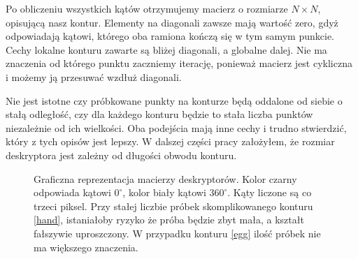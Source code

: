Po obliczeniu wszystkich kątów otrzymujemy macierz o rozmiarze $N \times N$,
opisującą nasz kontur. Elementy na diagonali zawsze mają wartość zero, gdyż
odpowiadają kątowi, którego oba ramiona kończą się w tym samym punkcie. Cechy
lokalne konturu zawarte są bliżej diagonali, a globalne dalej. Nie ma znaczenia
od którego punktu zaczniemy iterację, ponieważ macierz jest cykliczna i możemy
ją przesuwać wzdłuż diagonali.

Nie jest istotne czy próbkowane punkty na konturze będą oddalone od siebie o
stałą odległość, czy dla każdego konturu będzie to stała liczba punktów
niezależnie od ich wielkości. Oba podejścia mają inne cechy i trudno
stwierdzić, który z tych opisów jest lepszy. W dalszej części pracy założyłem,
że rozmiar deskryptora jest zależny od długości obwodu konturu.

\begin{figure}[h!] \centering {}
   \caption{Graficzna reprezentacja macierzy deskryptorów. Kolor
  czarny odpowiada kątowi $0^\circ$, kolor biały kątowi $360^\circ$. Kąty
  liczone są co trzeci piksel. Przy stałej liczbie próbek skomplikowanego
  konturu \ref{hand}, istaniałoby ryzyko że próba będzie zbyt mała, a kształt
  fałszywie uproszczony. W przypadku konturu \ref{egg} ilość próbek nie ma
  większego znaczenia.} \end{figure}


